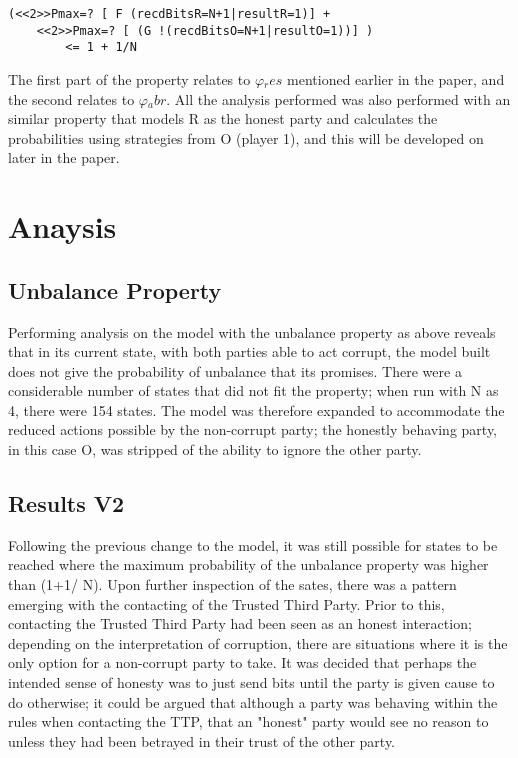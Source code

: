 \documentclass{l4proj}
\begin{document}
\begin{lstlisting}
(<<2>>Pmax=? [ F (recdBitsR=N+1|resultR=1)] + 
    <<2>>Pmax=? [ (G !(recdBitsO=N+1|resultO=1))] ) 
        <= 1 + 1/N
\end{lstlisting}

The first part of the property relates to $\varphi{_res}$ mentioned earlier in the paper, and the second relates to $\varphi{_abr}$. All the analysis performed was also performed with an similar property that models R as the honest party and calculates the probabilities using strategies from O (player 1), and this will be developed on later in the paper. 

\section{Anaysis}

\subsection{Unbalance Property}
Performing analysis on the model with the unbalance property as above reveals that in its current state, with both parties able to act corrupt, the model built does not give the probability of unbalance that its promises. There were a considerable number of states that did not fit the property; when run with N as 4, there were 154 states. The model was therefore expanded to accommodate the reduced actions possible by the non-corrupt party; the honestly behaving party, in this case O, was stripped of the ability to ignore the other party. 

\subsection{Results V2}

Following the previous change to the model, it was still possible for states to be reached where the maximum probability of the unbalance property was higher than (1+1/ N). Upon further inspection of the sates, there was a pattern emerging with the contacting of the Trusted Third Party. Prior to this, contacting the Trusted Third Party had been seen as an honest interaction; depending on the interpretation of corruption, there are situations where it is the only option for a non-corrupt party to take. It was decided that perhaps the intended sense of honesty was to just send bits until the party is given cause to do otherwise; it could be argued that although a party was behaving within the rules when contacting the TTP, that an "honest" party would see no reason to unless they had been betrayed in their trust of the other party.
\end{document}
